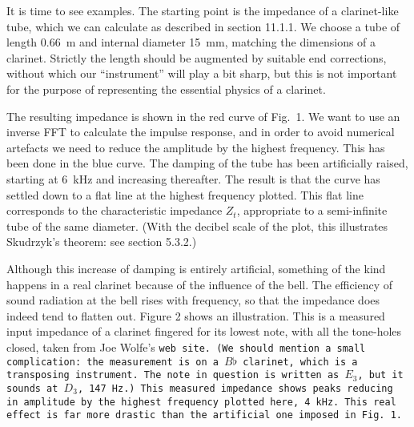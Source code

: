   It is time to see examples. The starting point is the impedance of a 
  clarinet-like tube, which we can calculate as described in section 11.1.1. We 
  choose a tube of length 0.66~m and internal diameter 15~mm, matching the 
  dimensions of a clarinet. Strictly the length should be augmented by suitable 
  end corrections, without which our ``instrument'' will play a bit sharp, but 
  this is not important for the purpose of representing the essential physics 
  of a clarinet. 

  The resulting impedance is shown in the red curve of Fig.\ 1. We want to use 
  an inverse FFT to calculate the impulse response, and in order to avoid 
  numerical artefacts we need to reduce the amplitude by the highest frequency. 
  This has been done in the blue curve. The damping of the tube has been 
  artificially raised, starting at 6~kHz and increasing thereafter. The result 
  is that the curve has settled down to a flat line at the highest frequency 
  plotted. This flat line corresponds to the characteristic impedance $Z_t$, 
  appropriate to a semi-infinite tube of the same diameter. (With the decibel 
  scale of the plot, this illustrates Skudrzyk's theorem: see section 5.3.2.) 


  Although this increase of damping is entirely artificial, something of the 
  kind happens in a real clarinet because of the influence of the bell. The 
  efficiency of sound radiation at the bell rises with frequency, so that the 
  impedance does indeed tend to flatten out. Figure 2 shows an illustration. 
  This is a measured input impedance of a clarinet fingered for its lowest 
  note, with all the tone-holes closed, taken from Joe Wolfe's \tt{}web 
  site\rm{}. (We should mention a small complication: the measurement is on a 
  $B\flat$ clarinet, which is a transposing instrument. The note in question is 
  written as $E_3$, but it sounds at $D_3$, 147~Hz.) This measured impedance 
  shows peaks reducing in amplitude by the highest frequency plotted here, 4 
  kHz. This real effect is far more drastic than the artificial one imposed in 
  Fig.\ 1. 


